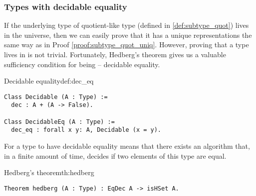 \subsubsection{Types with decidable equality}
If the underlying type of quotient-like type (defined in \ref{def:subtype_quot}) lives in the  universe, then we can easily prove that it has a unique representations the same way as in Proof \ref{proof:subtype_quot_uniq}. However, proving that a type lives in  is not trivial. Fortunately, Hedberg's theorem \cite{hedberg_1998} gives us a valuable sufficiency condition for being  -- decidable equality.
\begin{defi}{Decidable equality}{def:dec_eq}
\begin{verbatim}
Class Decidable (A : Type) :=
  dec : A + (A -> False).
  
Class DecidableEq (A : Type) :=
  dec_eq : forall x y: A, Decidable (x = y).
\end{verbatim}
\end{defi}
For a type to have decidable equality means that there exists an algorithm that, in a finite amount of time, decides if two elements of this type are equal.
\begin{theo}{Hedberg's theorem}{th:hedberg}
\begin{verbatim}
Theorem hedberg (A : Type) : EqDec A -> isHSet A.
\end{verbatim}
\end{theo}
